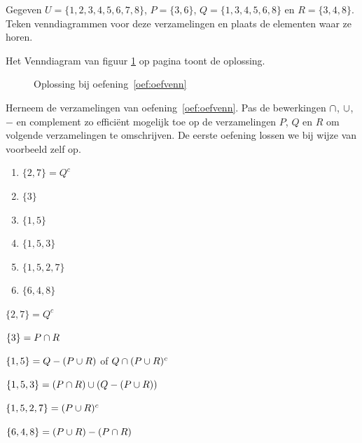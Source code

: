 \begin{oef}
\label{oef:oefvenn}
Gegeven $U = \{1,2,3,4,5,6,7,8\}$, $P = \{3,6\}$,  $Q =\{1,3,4,5,6,8\}$ en $R = \{3,4,8\}$.
Teken  venndiagrammen voor deze verzamelingen en plaats de elementen waar ze horen. 
\begin{opl}
Het Venndiagram van figuur \ref{fig:UPQ} op pagina \pageref{fig:UPQ} toont de oplossing.
\begin{figure}[htbp]
\centering

\caption{Oplossing bij oefening~\ref{oef:oefvenn}}
\label{fig:UPQ}
\end{figure}
\end{opl}
\end{oef}

\begin{oef}
Herneem de verzamelingen van oefening~\ref{oef:oefvenn}. Pas de bewerkingen $\cap$, $\cup$, $-$ en complement zo efficiënt mogelijk toe op de verzamelingen $P$, $Q$ en $R$ om volgende verzamelingen te omschrijven. De eerste oefening lossen we bij wijze van voorbeeld zelf op.
\begin{enumerate}
\item $\{2,7\}=Q^c$
\item $\{3\}$
\item $\{1,5\}$
\item $\{1,5,3\}$
\item $\{1,5,2,7\}$
\item $\{6,4,8\}$
\end{enumerate}
\begin{opl}
\item $\{2,7\}=Q^c$
\item $\{3\}=P\cap R$
\item $\{1,5\}=Q-(P\cup R)$ of $Q \cap (P \cup R)^c$
\item $\{1,5,3\}=(P\cap R)\cup (Q-(P\cup R))$
\item $\{1,5,2,7\}=(P\cup R)^c$
\item $\{6,4,8\}=(P\cup R)- (P \cap R)$
\end{opl}
\end{oef}


